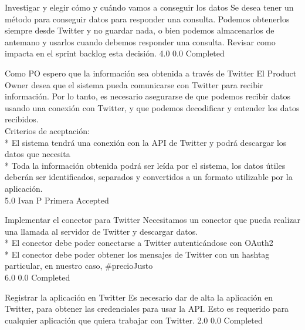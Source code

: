 		{Investigar y elegir cómo y cuándo vamos a conseguir los datos} %
		{Se desea tener un método para conseguir datos para responder una consulta.
Podemos obtenerlos siempre desde Twitter y no guardar nada, o bien podemos
almacenarlos de antemano y usarlos cuando debemos responder una consulta.
Revisar como impacta en el sprint backlog esta decisión.
} %
		{4.0} %
		{} %
		{0.0} %
		{Completed} %


\vspace{20pt}

	{Como PO espero que la información sea obtenida a través de Twitter} %
	{El Product Owner desea que el sistema pueda comunicarse con Twitter para
recibir información. Por lo tanto, es necesario asegurarse de que podemos
recibir datos usando una conexión con Twitter, y que podemos decodificar y
entender los datos recibidos.
  \\
Criterios de aceptación:\\
* El sistema tendrá una conexión con la API de Twitter y podrá descargar los datos que necesita  \\
* Toda la información obtenida podrá ser leída por el sistema, los datos útiles deberán ser identificados, separados y convertidos a un formato utilizable por la aplicación.\\
} %
	{} %
	{5.0} %
	{Ivan P} %
	{Primera} %
	{Accepted} %

		{Implementar el conector para Twitter} %
		{Necesitamos un conector que pueda realizar una llamada al servidor de Twitter
y descargar datos.\\
* El conector debe poder conectarse a Twitter autenticándose con OAuth2\\
* El conector debe poder obtener los mensajes de Twitter con un hashtag particular, en nuestro caso, \#precioJusto\\
} %
		{6.0} %
		{} %
		{0.0} %
		{Completed} %

		{Registrar la aplicación en Twitter} %
		{Es necesario dar de alta la aplicación en Twitter, para obtener las
credenciales para usar la API. Esto es requerido para cualquier aplicación que
quiera trabajar con Twitter.
} %
		{2.0} %
		{} %
		{0.0} %
		{Completed} %

